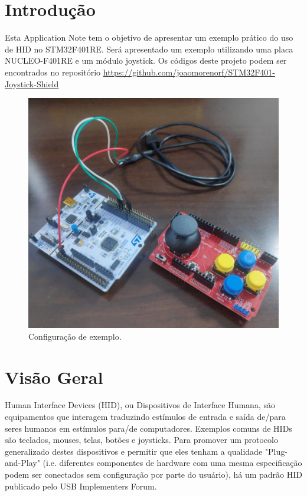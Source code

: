 \documentclass[a4paper,twocolumn,twoside,11pt]{article}
\title{}
\author{}
\date{22.02.2019}
\makeatletter
\renewcommand{\familydefault}{\sfdefault}
\renewcommand{\familydefault}{\sfdefault}
\renewcommand{\familydefault}{\sfdefault}
\renewcommand*{\maketitle}{%
\renewcommand{\familydefault}{\sfdefault}
\thispagestyle{first}
\twocolumn[
\vspace*{-10pt}%
\begin{@twocolumnfalse}
    \begin{center}
        \vspace*{80pt}
        \renewcommand{\title}{STM32F401RE como HID}
        \renewcommand{\author}{L.~Lindgren e J.~Falcão}
        \Huge{\textbf{\title \\\Large{por \author}}}
    \end{center}
    \end{@twocolumnfalse}
    \vspace*{90pt}
    ]
}%
\makeatother
\begin{document}
    \maketitle
\section{Introdução}

Esta Application Note tem o objetivo de apresentar um exemplo prático do uso de HID no STM32F401RE. Será apresentado um exemplo utilizando uma placa NUCLEO-F401RE e um módulo joystick. Os códigos deste projeto podem ser encontrados no repositório \url{https://github.com/joaomorenorf/STM32F401-Joystick-Shield}

\tableofcontents

\begin{figure}
  \includegraphics[width=\linewidth]{setup.jpg}
  \caption{Configuração de exemplo.}
  \label{fig:setup}
\end{figure}

\clearpage
\pagestyle{body}

\section{Visão Geral}
Human Interface Devices (HID), ou Dispositivos de Interface Humana, são equipamentos que interagem traduzindo estímulos de entrada e saída de/para seres humanos em estímulos para/de computadores. Exemplos comuns de HIDs são teclados, mouses, telas, botões e joysticks. Para promover um protocolo generalizado destes dispositivos e permitir que eles tenham a qualidade "Plug-and-Play" (i.e. diferentes componentes de hardware com uma mesma especificação podem ser conectados sem configuração por parte do usuário), há um padrão HID publicado pelo USB Implementers Forum.
\end{document}

